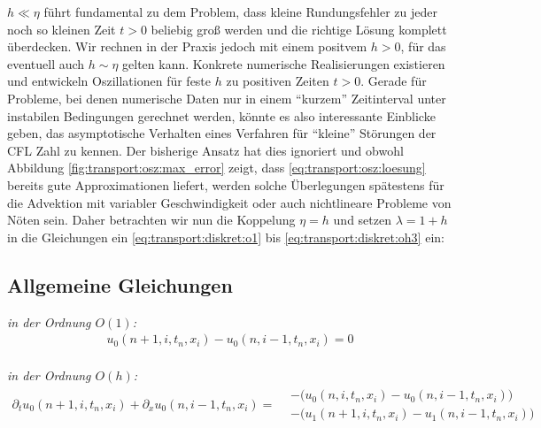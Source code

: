 
$h \ll \eta$ führt fundamental zu dem Problem, dass kleine Rundungsfehler zu jeder noch so kleinen Zeit $t > 0$ beliebig groß werden und die richtige Lösung komplett überdecken.
Wir rechnen in der Praxis jedoch mit einem positvem $h > 0$, für das eventuell auch $h \sim \eta$ gelten kann.
Konkrete numerische Realisierungen existieren und entwickeln Oszillationen für feste $h$ zu positiven Zeiten $t > 0$.
Gerade für Probleme, bei denen numerische Daten nur in einem ``kurzem'' Zeitinterval unter instabilen Bedingungen gerechnet werden, könnte es also interessante Einblicke geben, das asymptotische Verhalten eines Verfahren für ``kleine'' Störungen der CFL Zahl zu kennen.
Der bisherige Ansatz hat dies ignoriert und obwohl Abbildung \ref{fig:transport:osz:max_error} zeigt, dass \eqref{eq:transport:osz:loesung} bereits gute Approximationen liefert, werden solche Überlegungen spätestens für die Advektion mit variabler Geschwindigkeit oder auch nichtlineare Probleme von Nöten sein.
Daher betrachten wir nun die Koppelung $\eta = h$ und setzen $\lambda = 1 + h$ in die Gleichungen ein \eqref{eq:transport:diskret:o1} bis \eqref{eq:transport:diskret:oh3} ein:

\subsection*{Allgemeine Gleichungen}

\vspace{0.4cm}
\noindent \emph{in der Ordnung $O(1)$:}
\begin{align}\label{eq:transport:kleineta:o1}
u_0(n+1, i, t_n, x_i) - u_0(n, i-1, t_n, x_i) = 0
\end{align}\\

\noindent \emph{in der Ordnung $O(h)$:}
\begin{align}\label{eq:transport:kleineta:oh}
\partial_t u_0(n+1, i, t_n, x_i) + \partial_x u_0(n, i-1, t_n, x_i) =
\begin{split}
&- \bigl( u_0(n, i, t_n, x_i) - u_0(n, i-1, t_n, x_i) \bigr)\\
&- \bigl( u_1(n+1, i, t_n, x_i) - u_1(n, i-1, t_n, x_i) \bigr)
\end{split}
\end{align}\\

